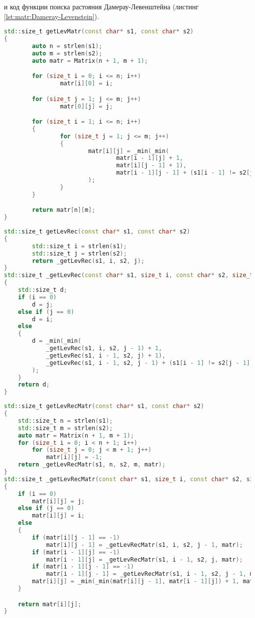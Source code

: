         и код функции поиска растояния Дамерау-Левенштейна (листинг \ref{lst:matr:Dameray-Levenstein}).

        \begin{lstlisting}[language=C++, label=lst:matr:Levenstein, caption=Функция нерекурсивного поиска с заполнением матрицы]
std::size_t getLevMatr(const char* s1, const char* s2)
{
        auto n = strlen(s1);
        auto m = strlen(s2);
        auto matr = Matrix(n + 1, m + 1);

        for (size_t i = 0; i <= n; i++)
                matr[i][0] = i;

        for (size_t j = 1; j <= m; j++)
                matr[0][j] = j;

        for (size_t i = 1; i <= n; i++)
        {
                for (size_t j = 1; j <= m; j++)
                {
                        matr[i][j] = _min(_min(
                                matr[i - 1][j] + 1,
                                matr[i][j - 1] + 1),
                                matr[i - 1][j - 1] + (s1[i - 1] != s2[j - 1])
                        );
                }
        }

        return matr[n][m];
}
        \end{lstlisting}

        \begin{lstlisting}[language=C++, label=lst:rec:Levenstein, caption=Функция рекурсивного поиска без заполнения матрицы]
std::size_t getLevRec(const char* s1, const char* s2)
{
        std::size_t i = strlen(s1);
        std::size_t j = strlen(s2);
        return _getLevRec(s1, i, s2, j);
}
std::size_t _getLevRec(const char* s1, size_t i, const char* s2, size_t j)
{
	std::size_t d;
	if (i == 0)
		d = j;
	else if (j == 0)
		d = i;
	else
	{
		d = _min(_min(
			_getLevRec(s1, i, s2, j - 1) + 1,
			_getLevRec(s1, i - 1, s2, j) + 1),
			_getLevRec(s1, i - 1, s2, j - 1) + (s1[i - 1] != s2[j - 1])
		);
	}
	return d;
}
        \end{lstlisting}

        \begin{lstlisting}[language=C++, label=lst:rec-matr:Levenstein, caption=Функция рекурсивного поиска с заполнением матрицы]
std::size_t getLevRecMatr(const char* s1, const char* s2)
{
    std::size_t n = strlen(s1);
    std::size_t m = strlen(s2);
    auto matr = Matrix(n + 1, m + 1);
    for (size_t i = 0; i < n + 1; i++)
        for (size_t j = 0; j < m + 1; j++)
            matr[i][j] = -1;
    return _getLevRecMatr(s1, n, s2, m, matr);
}
std::size_t _getLevRecMatr(const char* s1, size_t i, const char* s2, size_t j, Matrix& matr)
{
	if (i == 0)
		matr[i][j] = j;
	else if (j == 0)
		matr[i][j] = i;
	else
	{
		if (matr[i][j - 1] == -1)
			matr[i][j - 1] = _getLevRecMatr(s1, i, s2, j - 1, matr);
		if (matr[i - 1][j] == -1)
			matr[i - 1][j] = _getLevRecMatr(s1, i - 1, s2, j, matr);
		if (matr[i - 1][j - 1] == -1)
			matr[i - 1][j - 1] = _getLevRecMatr(s1, i - 1, s2, j - 1, matr);
		matr[i][j] = _min(_min(matr[i][j - 1], matr[i - 1][j]) + 1, matr[i - 1][j - 1] + (s1[i - 1] != s2[j - 1]));
	}

	return matr[i][j];
}
        \end{lstlisting}

